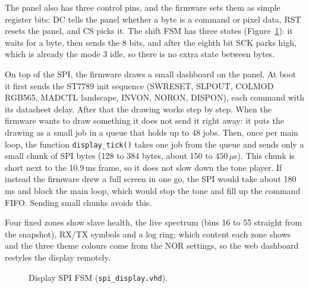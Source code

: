 \documentclass[a4paper,10pt]{article}
\begin{document}
The panel also has three control pins, and the firmware sets them as simple register bits:
DC tells the panel whether a byte is a command or pixel data, RST resets the panel, and CS
picks it. The shift FSM has three states (Figure~\ref{fig:disp-fsm}): it waits for a byte,
then sends the 8 bits, and after the eighth bit SCK parks high, which is already the mode 3
idle, so there is no extra state between bytes.

On top of the SPI, the firmware draws a small dashboard on the panel. At boot it first
sends the ST7789 init sequence (SWRESET, SLPOUT, COLMOD RGB565, MADCTL landscape, INVON,
NORON, DISPON), each command with its datasheet delay. After that the drawing works step by
step. When the firmware wants to draw something it does not send it right away: it puts the
drawing as a small job in a queue that holds up to 48 jobs. Then, once per main loop, the
function \texttt{display\_tick()} takes one job from the queue and sends only a small chunk
of SPI bytes (128 to 384 bytes, about 150 to $450\,\mu$s). This chunk is short next to the
10.9\,ms frame, so it does not slow down the tone player. If instead the firmware drew a
full screen in one go, the SPI would take about 180\,ms and block the main loop, which would
stop the tone and fill up the command FIFO. Sending small chunks avoids this.

Four fixed zones show slave health, the live spectrum
(bins 16 to 55 straight from the snapshot), RX/TX symbols and a log ring; which
content each zone shows and the three theme colours come from the NOR settings, so
the web dashboard restyles the display remotely.

\begin{figure}[H]
\centering
{}
\caption{Display SPI FSM (\texttt{spi\_display.vhd}).}
\label{fig:disp-fsm}
\end{figure}
\end{document}

